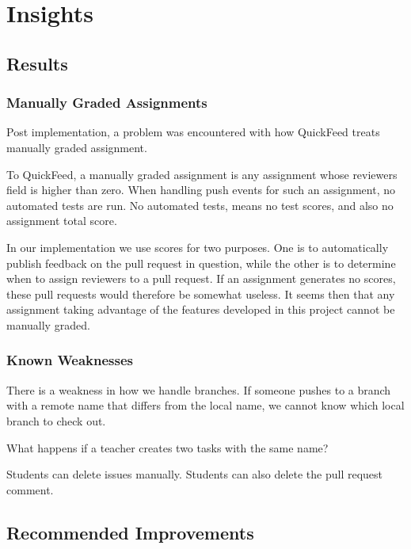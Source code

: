 
\chapter{Insights}

\section{Results}


\subsection{Manually Graded Assignments}

Post implementation, a problem was encountered with how QuickFeed treats manually graded assignment.

To QuickFeed, a manually graded assignment is any assignment whose reviewers field is higher than zero.
When handling push events for such an assignment, no automated tests are run.
No automated tests, means no test scores, and also no assignment total score.

In our implementation we use scores for two purposes.
One is to automatically publish feedback on the pull request in question, while the other is to determine when to assign reviewers to a pull request.
If an assignment generates no scores, these pull requests would therefore be somewhat useless.
It seems then that any assignment taking advantage of the features developed in this project cannot be manually graded.

\subsection{Known Weaknesses}

There is a weakness in how we handle branches.
If someone pushes to a branch with a remote name that differs from the local name, we cannot know which local branch to check out.

What happens if a teacher creates two tasks with the same name?

Students can delete issues manually.
Students can also delete the pull request comment.

\section{Recommended Improvements}

